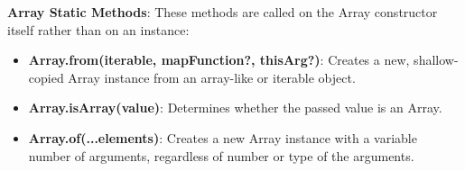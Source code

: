 \documentclass{report}
\begin{document}
    \bigbreak \noindent 
    \textbf{Array Static Methods}: These methods are called on the Array constructor itself rather than on an instance:
    \begin{itemize}
        \item \textbf{Array.from(iterable, mapFunction?, thisArg?)}: Creates a new, shallow-copied Array instance from an array-like or iterable object.
        \item \textbf{Array.isArray(value)}: Determines whether the passed value is an Array.
        \item \textbf{Array.of(...elements)}: Creates a new Array instance with a variable number of arguments, regardless of number or type of the arguments.
    \end{itemize}

    \pagebreak 























    
\end{document}
